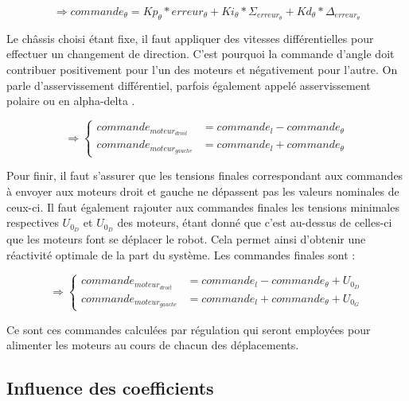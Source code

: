 \documentclass[a4paper,11pt]{article}
\begin{document}
\begin{equation*}
    \Rightarrow commande_{\theta} = Kp_{\theta}*erreur_{\theta}+Ki_{\theta}*\Sigma_{erreur_{\theta}}+Kd_{\theta}*\Delta_{erreur_{\theta}}
\end{equation*}

Le châssis choisi étant fixe, il faut appliquer des vitesses différentielles pour effectuer un changement de direction. C'est pourquoi la commande d'angle doit contribuer positivement pour l'un des moteurs et négativement pour l'autre. On parle d'asservissement différentiel, parfois également appelé asservissement polaire ou en alpha-delta \cite{rouviere_asservissement_2007}.

\begin{equation*}
    \Rightarrow\left\{
        \begin{aligned}
           commande_{moteur_{droit}} & = commande_{l} - commande_{\theta}\\
           commande_{moteur_{gauche}} & = commande_{l} + commande_{\theta}
           \end{aligned}
    \right.
\end{equation*}

Pour finir, il faut s'assurer que les tensions finales correspondant aux commandes à envoyer aux moteurs droit et gauche ne dépassent pas les valeurs nominales de ceux-ci. Il faut également rajouter aux commandes finales les tensions minimales respectives $U_{0_{D}}$ et $U_{0_{D}}$ des moteurs, étant donné que c'est au-dessus de celles-ci que les moteurs font se déplacer le robot. Cela permet ainsi d'obtenir une réactivité optimale de la part du système. Les commandes finales sont :

\begin{equation*}
    \Rightarrow\left\{
        \begin{aligned}
           commande_{moteur_{droit}} & = commande_{l} - commande_{\theta}+U_{0_{D}}\\
           commande_{moteur_{gauche}} & = commande_{l} + commande_{\theta}+U_{0_{G}}
           \end{aligned}
    \right.
\end{equation*}

Ce sont ces commandes calculées par régulation qui seront employées pour alimenter les moteurs au cours de chacun des déplacements.

\subsection{\label{subsec:influence}Influence des coefficients \cite{le_lann_pid_2007}}
\end{document}
